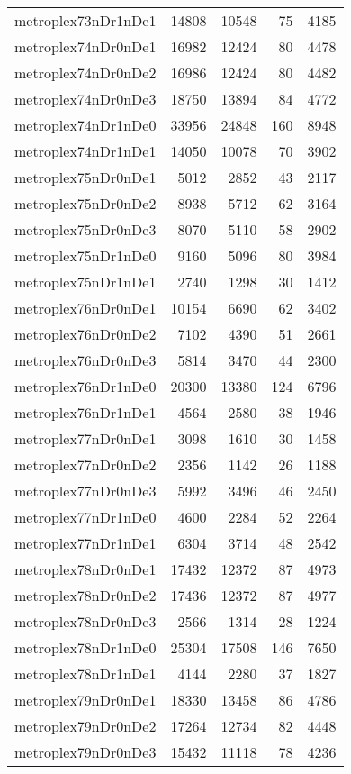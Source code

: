 \begin{tabular}{lrrrr}
metroplex73nDr1nDe1 & 14808 & 10548 & 75 & 4185 \\
metroplex74nDr0nDe1 & 16982 & 12424 & 80 & 4478 \\
metroplex74nDr0nDe2 & 16986 & 12424 & 80 & 4482 \\
metroplex74nDr0nDe3 & 18750 & 13894 & 84 & 4772 \\
metroplex74nDr1nDe0 & 33956 & 24848 & 160 & 8948 \\
metroplex74nDr1nDe1 & 14050 & 10078 & 70 & 3902 \\
metroplex75nDr0nDe1 & 5012 & 2852 & 43 & 2117 \\
metroplex75nDr0nDe2 & 8938 & 5712 & 62 & 3164 \\
metroplex75nDr0nDe3 & 8070 & 5110 & 58 & 2902 \\
metroplex75nDr1nDe0 & 9160 & 5096 & 80 & 3984 \\
metroplex75nDr1nDe1 & 2740 & 1298 & 30 & 1412 \\
metroplex76nDr0nDe1 & 10154 & 6690 & 62 & 3402 \\
metroplex76nDr0nDe2 & 7102 & 4390 & 51 & 2661 \\
metroplex76nDr0nDe3 & 5814 & 3470 & 44 & 2300 \\
metroplex76nDr1nDe0 & 20300 & 13380 & 124 & 6796 \\
metroplex76nDr1nDe1 & 4564 & 2580 & 38 & 1946 \\
metroplex77nDr0nDe1 & 3098 & 1610 & 30 & 1458 \\
metroplex77nDr0nDe2 & 2356 & 1142 & 26 & 1188 \\
metroplex77nDr0nDe3 & 5992 & 3496 & 46 & 2450 \\
metroplex77nDr1nDe0 & 4600 & 2284 & 52 & 2264 \\
metroplex77nDr1nDe1 & 6304 & 3714 & 48 & 2542 \\
metroplex78nDr0nDe1 & 17432 & 12372 & 87 & 4973 \\
metroplex78nDr0nDe2 & 17436 & 12372 & 87 & 4977 \\
metroplex78nDr0nDe3 & 2566 & 1314 & 28 & 1224 \\
metroplex78nDr1nDe0 & 25304 & 17508 & 146 & 7650 \\
metroplex78nDr1nDe1 & 4144 & 2280 & 37 & 1827 \\
metroplex79nDr0nDe1 & 18330 & 13458 & 86 & 4786 \\
metroplex79nDr0nDe2 & 17264 & 12734 & 82 & 4448 \\
metroplex79nDr0nDe3 & 15432 & 11118 & 78 & 4236 \\

\end{tabular}
